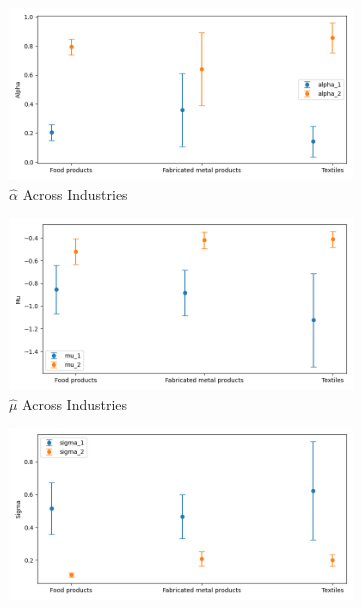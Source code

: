 \documentclass{article}
\begin{document}
\begin{figure}[ht!]
    \centering 
    \caption{AR(1) Normal Model Across Industries}
    \begin{subfigure}[t]{0.32\textwidth}
        \centering
        \includegraphics[width=\textwidth]{figure/ar1_normal_alpha_across_industries.png}
        \caption{$\hat\alpha$ Across Industries}
    \end{subfigure}
    \begin{subfigure}[t]{0.32\textwidth}
        \centering
        \includegraphics[width=\textwidth]{figure/ar1_normal_mu_across_industries.png}
        \caption{$\hat\mu$ Across Industries}
    \end{subfigure}
    \begin{subfigure}[t]{0.32\textwidth}
        \centering
        \includegraphics[width=\textwidth]{figure/ar1_normal_sigma_across_industries.png}

\end{subfigure}
\end{figure}
\end{document}
